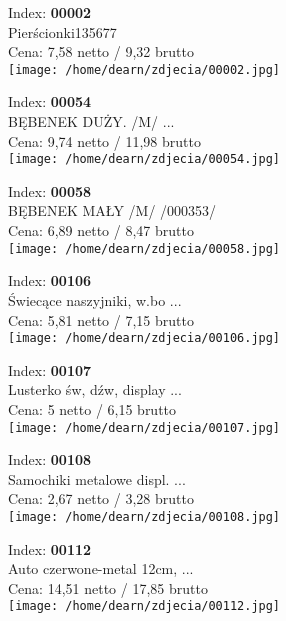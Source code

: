 
{Index: \textbf{00002}\\
Pierścionki135677\\
Cena: 7,58 netto / 9,32 brutto\\
  \texttt{[image: /home/dearn/zdjecia/00002.jpg]}}\newline\newline

{Index: \textbf{00054}\\
BĘBENEK DUŻY. /M/         ...\\
Cena: 9,74 netto / 11,98 brutto\\
  \texttt{[image: /home/dearn/zdjecia/00054.jpg]}}\newline\newline

{Index: \textbf{00058}\\
BĘBENEK MAŁY /M/ /000353/\\
Cena: 6,89 netto / 8,47 brutto\\
  \texttt{[image: /home/dearn/zdjecia/00058.jpg]}}\newline\newline

{Index: \textbf{00106}\\
Świecące naszyjniki, w.bo ...\\
Cena: 5,81 netto / 7,15 brutto\\
  \texttt{[image: /home/dearn/zdjecia/00106.jpg]}}\newline\newline

{Index: \textbf{00107}\\
Lusterko św, dźw, display ...\\
Cena: 5 netto / 6,15 brutto\\
  \texttt{[image: /home/dearn/zdjecia/00107.jpg]}}\newline\newline

{Index: \textbf{00108}\\
Samochiki metalowe displ. ...\\
Cena: 2,67 netto / 3,28 brutto\\
  \texttt{[image: /home/dearn/zdjecia/00108.jpg]}}\newline\newline

{Index: \textbf{00112}\\
Auto czerwone-metal 12cm, ...\\
Cena: 14,51 netto / 17,85 brutto\\
  \texttt{[image: /home/dearn/zdjecia/00112.jpg]}}\newline\newline

